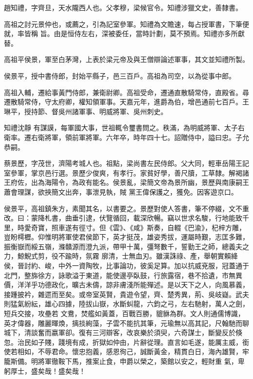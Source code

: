 
\begin{pinyinscope}

 趙知禮，字齊旦，天水隴西人也。父孝穆，梁候官令。知禮涉獵文史，善隸書。



 高祖之討元景仲也，或薦之，引為記室參軍。知禮為文贍速，每占授軍書，下筆便就，率皆稱
 旨。由是恒侍左右，深被委任，當時計劃，莫不預焉。知禮亦多所獻替。



 高祖平侯景，軍至白茅灣，上表於梁元帝及與王僧辯論述軍事，其文並知禮所製。



 侯景平，授中書侍郎，封始平縣子，邑三百戶。高祖為司空，以為從事中郎。



 高祖入輔，遷給事黃門侍郎，兼衛尉卿。高祖受命，遷通直散騎常侍，直殿省。尋遷散騎常侍，守太府卿，權知領軍事。天嘉元年，進爵為伯，增邑通前七百戶。王琳平，授持節、督吳州諸軍事、明威將軍、吳州刺史。



 知禮沈靜
 有謀謨，每軍國大事，世祖輒令璽書問之。秩滿，為明威將軍、太子右衛率。遷右衛將軍，領前軍將軍。六年卒，時年四十七。詔贈侍中，謚曰忠。子允恭嗣。



 蔡景歷，字茂世，濟陽考城人也。祖點，梁尚書左民侍郎。父大同，輕車岳陽王記室參軍，掌京邑行選。景歷少俊爽，有孝行。家貧好學，善尺牘，工草隸。解褐諸王府佐，出為海陽令，為政有能名。侯景亂，梁簡文帝為景所幽，景歷與南康嗣王蕭會理謀，欲挾簡文出奔，事泄見執，賊
 黨王偉保護之，獲免。因客遊京口。



 侯景平，高祖鎮朱方，素聞其名，以書要之。景歷對使人答書，筆不停綴，文不重改。曰：蒙降札書，曲垂引逮，伏覽循回，載深欣暢。竊以世求名駿，行地能致千里，時愛奇寶，照車遂有徑寸。但《雲》、《咸》斯奏，自輟《巴渝》，杞梓方雕，豈盼樗櫪。仰惟明將軍使君侯節下，英才挺茂，雄姿秀拔，運屬時艱，志匡多難，振衡嶽而綏五嶺，滌贛源而澄九派，帶甲十萬，彊弩數千，誓勤王之師，總義夫之力，鯨鯢式剪，役不踰時，氛霧
 廓清，士無血刃。雖漢誅祿、產，舉朝實賴絳侯，晉討約、峻，中外一資陶牧，比事論功，彼奚足算。加以抗威兗服，冠蓋通于北門，整旆徐方，詠歌溢于東道，能使邊亭臥鼓，行旅露宿，巷不拾遺，市無異價，洋洋乎功德政化，曠古未儔，諒非膚淺所能殫述。是以天下之人，向風慕義，接踵披衿，雜遝而至矣。或帝室英賢，貴遊令望，齊、楚秀異，荊、吳岐嶷。武夫則猛氣紛紜，雄心四據，陸拔山嶽，水斷虯龍，六鈞之弓，左右馳射，萬人之劍，短兵交接，攻壘若
 文鴦，焚艦如黃蓋，百戰百勝，貔貅為群。文人則通儒博識，英才偉器，雕麗暉煥，摛掞絢藻，子雲不能抗其筆，元瑜無以高其記，尺翰馳而聊城下，清談奮而嬴軍卻。復有三河辯客，改哀樂於須臾，六奇謀士，斷變反於倏忽。治民如子賤，踐境有成，折獄如仲由，片辭從理。直言如毛遂，能厲主威，銜使若相如，不辱君命。懷忠抱義，感恩徇己，誠斷黃金，精貫白日，海內雄賢，牢籠斯備。明將軍徹鞍下馬，推案止食，申爵以榮之，築館以安之，輕財重
 氣，卑躬厚士，盛矣哉！盛矣哉！




\end{pinyinscope}
